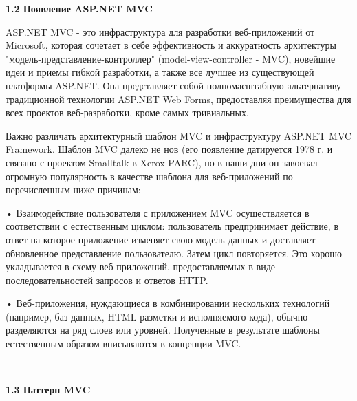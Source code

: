 \documentclass[14pt,a4paper]{extreport}
\begin{document}
	\textbf{1.2 Появление ASP.NET MVC}

	\parindent=1cm ASP.NET MVC - это инфраструктура для разработки веб-приложений от Microsoft, которая сочетает в себе эффективность и аккуратность архитектуры "модель-представление-контроллер" (model-view-controller - MVC), новейшие идеи и приемы гибкой разработки, а также все лучшее из существующей платформы ASP.NET. Она представляет собой полномасштабную альтернативу традиционной технологии ASP.NET Web Forms, предоставляя преимущества для всех проектов веб-разработки, кроме самых тривиальных.\par
	Важно различать архитектурный шаблон MVC и инфраструктуру ASP.NET MVC Framework. Шаблон MVC далеко не нов (его появление датируется 1978 г. и связано с проектом Smalltalk в Xerox PARC), но в наши дни он завоевал огромную популярность в качестве шаблона для веб-приложений по перечисленным ниже причинам:\par
	• Взаимодействие пользователя с приложением MVC осуществляется в соответствии с естественным циклом: пользователь предпринимает действие, в ответ на которое приложение изменяет свою модель данных и доставляет обновленное представление пользователю. Затем цикл повторяется. Это хорошо укладывается в схему веб-приложений, предоставляемых в виде последовательностей запросов и ответов HTTP.\par
	• Веб-приложения, нуждающиеся в комбинировании нескольких технологий (например, баз данных, HTML-разметки и исполняемого кода), обычно разделяются на ряд слоев или уровней. Полученные в результате шаблоны естественным образом вписываются в концепции MVC.\par
	~\\

	\textbf{1.3 Паттерн MVC}
\end{document}
